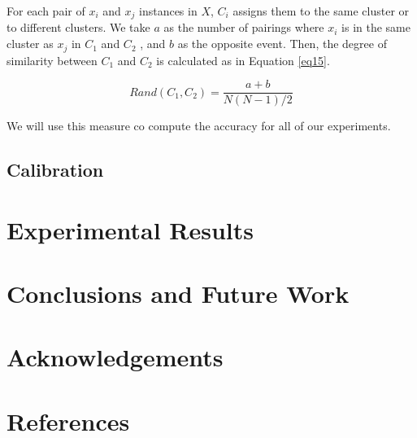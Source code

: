 \documentclass[review]{elsarticle}
\begin{document}
For each pair of $x_i$ and $x_j$ instances in $X$, $C_i$ assigns them to the same cluster or to different clusters. We take $a$ as the number of pairings where $x_i$ is in the same cluster as $x_j$ in $C_1$ and $C_2$ , and $b$ as the opposite event. Then, the degree of similarity between $C_1$ and $C_2$ is calculated as in Equation \eqref{eq15}.

\begin{equation}
Rand(C_1, C_2) = \frac{a + b}{N(N - 1)/2}
\label{eq15}
\end{equation}

We will use this measure co compute the accuracy for all of our experiments.

\subsection{Calibration}

\section{Experimental Results}

\begin{table}[!h]
	\centering
	\setlength{\tabcolsep}{7pt}
	\renewcommand{\arraystretch}{0.9}

	\caption{Experimental results obtained with X\% of labeled data}
	\label{undefined}
\end{table}

\section{Conclusions and Future Work}

\section{Acknowledgements}

\clearpage

\section*{References}


\end{document}
